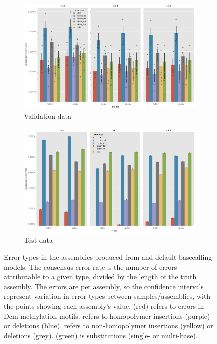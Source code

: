 \begin{figure}
     \centering
     \begin{subfigure}[b]{0.9\textwidth}
        \includegraphics[width=1.0\textwidth]{Chapter4/Figs/eval_error_types.png}
        \centering
        \caption{Validation data}
        \label{fig:eval-error_types}
     \end{subfigure}
     \hfill
     \begin{subfigure}[b]{0.9\textwidth}
         \centering
        \includegraphics[width=1.0\textwidth]{Chapter4/Figs/test_error_types.png}
         \caption{Test data}
         \label{fig:test-error_types}
     \end{subfigure}
        \caption{Error types in the  assemblies produced from \tubby{} and default \guppy{} basecalling models. The consensus error rate is the number of errors attributable to a given type, divided by the length of the truth assembly. The errors are per assembly, so the confidence intervals represent variation in error types between samples/assemblies, with the points showing each assembly's value.  (red) refers to errors in Dcm-methylation motifs.  refers to homopolymer insertions (purple) or deletions (blue).  refers to non-homopolymer insertions (yellow) or deletions (grey).  (green) is substitutions (single- or multi-base).}
        \label{fig:error_types}
\end{figure}

